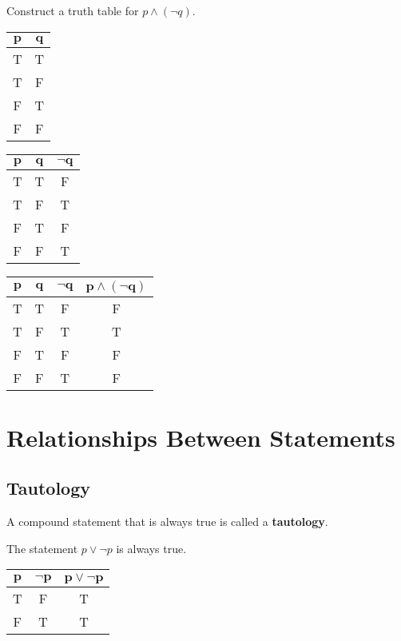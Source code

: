 \documentclass[../notes.tex]{subfiles}
\begin{document}
			\begin{example}
				Construct a truth table for $p \land (\lnot q)$.
					\begin{center}
						\begin{tabular}{| c c |}
							\hline
							$\mathbf{p}$ & $\mathbf{q}$\\
							\hline
							T & T\\
							T & F\\
							F & T\\
							F & F\\
							\hline
						\end{tabular} \hspace{0.25cm}
						\begin{tabular}{| c c | c|}
							\hline
							$\mathbf{p}$ & $\mathbf{q}$ & $\mathbf{\lnot q}$\\
							\hline
							T & T & F\\
							T & F & T\\
							F & T & F\\
							F & F & T\\
							\hline
						\end{tabular} \hspace{0.25cm}
						\begin{tabular}{| c c | c | c|}
							\hline
							$\mathbf{p}$ & $\mathbf{q}$ & $\mathbf{\lnot q}$ & $\mathbf{p \land (\lnot q)}$\\
							\hline
							T & T & F & F\\
							T & F & T & T\\
							F & T & F & F\\
							F & F & T & F\\
							\hline
						\end{tabular}
					\end{center}
			\end{example}
			\pagebreak
		\section{Relationships Between Statements}
			\subsection{Tautology}
				A compound statement that is always true is called a \textbf{tautology}.
				\begin{example}
					The statement $p \lor \lnot p$ is always true.
					\begin{center}
						\begin{tabular}{| c c | c |}
							\hline
							$\mathbf{p}$ & $\mathbf{\lnot p}$ & $\mathbf{p \lor \lnot p}$\\
							\hline
							T & F & T\\
							F & T & T\\
							\hline
						\end{tabular}
					\end{center}
				\end{example}
\end{document}
